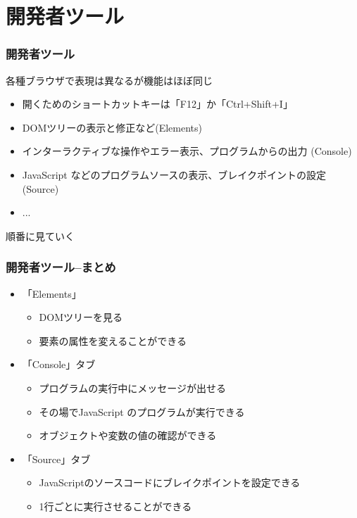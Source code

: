 

\frame{\maketitle}
\section{開発者ツール}
\begin{frame}[containsverbatim]
 \frametitle{開発者ツール}
 各種ブラウザで表現は異なるが機能はほぼ同じ
 \begin{itemize}
  \item 開くためのショートカットキーは「F12」か「Ctrl+Shift+I」
  \item DOMツリーの表示と修正など(Elements)
  \item インターラクティブな操作やエラー表示、プログラムからの出力
        (Console)
  \item JavaScript などのプログラムソースの表示、ブレイクポイントの設定
        (Source)
  \item ...
 \end{itemize}
 順番に見ていく
\end{frame}
\begin{frame}
 \frametitle{開発者ツール--まとめ}
\begin{itemize}
 \item  「Elements」
 \begin{itemize}
	\item DOMツリーを見る
	\item 要素の属性を変えることができる
 \end{itemize}
 \item 「Console」タブ
 \begin{itemize}
	\item プログラムの実行中にメッセージが出せる
	\item その場でJavaScript のプログラムが実行できる
	\item オブジェクトや変数の値の確認ができる
 \end{itemize}
 \item 「Source」タブ
 \begin{itemize}
	\item JavaScriptのソースコードにブレイクポイントを設定できる
	\item 1行ごとに実行させることができる
 \end{itemize}
			 \end{itemize}
\end{frame}
